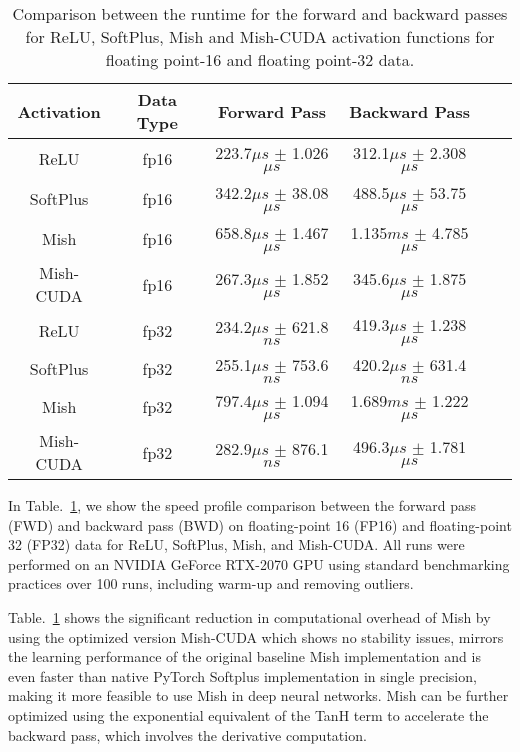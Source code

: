 \documentclass{bmvc2k}
\begin{document}
\begin{table}[h]
	\begin{center}
		\begin{tabular}{|c|c|c|c|c|c|}
			\hline
			Activation & Data Type & Forward Pass & Backward Pass \\
			\hline\hline
			ReLU & fp16 & 223.7$\mu s$ $\pm$ 1.026$\mu s$ & 312.1$\mu s$ $\pm$ 2.308$\mu s$ \\
			SoftPlus & fp16 & 342.2$\mu s$ $\pm$ 38.08$\mu s$ & 488.5$\mu s$ $\pm$ 53.75$\mu s$ \\
			Mish & fp16 & 658.8$\mu s$ $\pm$ 1.467$\mu s$ & 1.135$ms$ $\pm$ 4.785$\mu s$ \\
			Mish-CUDA & fp16 & 267.3$\mu s$ $\pm$ 1.852$\mu s$ & 345.6$\mu s$ $\pm$ 1.875$\mu s$ \\
			\hline
			ReLU & fp32 & 234.2$\mu s$ $\pm$ 621.8$ns$  & 419.3$\mu s$ $\pm$ 1.238$\mu s$ \\
			SoftPlus & fp32 & 255.1$\mu s$ $\pm$ 753.6$ns$ & 420.2$\mu s$ $\pm$ 631.4$ns$ \\
			Mish & fp32 & 797.4$\mu s$ $\pm$ 1.094$\mu s$ & 1.689$ms$ $\pm$ 1.222$\mu s$ \\
			Mish-CUDA & fp32 & 282.9$\mu s$ $\pm$ 876.1$ns$ & 496.3$\mu s$ $\pm$ 1.781$\mu s$ \\
			\hline
		\end{tabular}
	\end{center}
	\caption{Comparison between the runtime for the forward and backward passes for ReLU, SoftPlus, Mish and Mish-CUDA activation functions for floating point-16 and floating point-32 data.}
	\label{tab:speed}
\end{table}

In Table.~\ref{tab:speed}, we show the speed profile comparison between the forward pass (FWD) and backward pass (BWD) on floating-point 16 (FP16) and floating-point 32 (FP32) data for ReLU, SoftPlus, Mish, and Mish-CUDA. All runs were performed on an NVIDIA GeForce RTX-2070 GPU using standard benchmarking practices over 100 runs, including warm-up and removing outliers.

Table.~\ref{tab:speed} shows the significant reduction in computational overhead of Mish by using the optimized version Mish-CUDA which shows no stability issues, mirrors the learning performance of the original baseline Mish implementation and is even faster than native PyTorch Softplus implementation in single precision, making it more feasible to use Mish in deep neural networks. Mish can be further optimized using the exponential equivalent of the TanH term to accelerate the backward pass, which involves the derivative computation.
\end{document}
